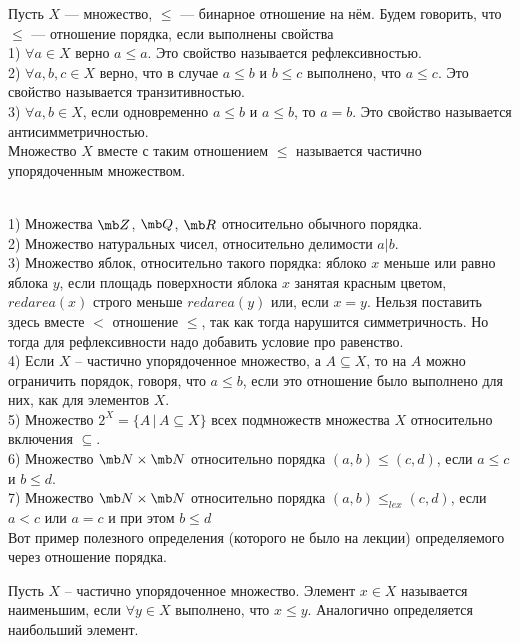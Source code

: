 \dfn Пусть $X$ --- множество, $\leq$ --- бинарное отношение на нём. Будем говорить, что $\leq$ --- отношение порядка, если выполнены свойства\\
1)  $\forall a \in X$ верно $a \leq a$. Это свойство называется рефлексивностью.\\
2)  $\forall a,b,c \in X$ верно, что в случае $a \leq b $ и $b \leq c$ выполнено, что $a \leq c$. Это свойство называется транзитивностью.\\
3)  $\forall a,b \in X$, если одновременно $a\leq b$ и $a \leq b$, то $a=b$. Это свойство называется антисимметричностью.\\
Множество $X$ вместе с таким отношением $\leq$ называется частично упорядоченным множеством.
\edfn

\exm \\
1) Множества $\mb Z$, $\mb Q$, $\mb R$ относительно обычного порядка.\\
2) Множество натуральных чисел, относительно делимости $a | b$.\\
3) Множество яблок, относительно такого порядка: яблоко $x$ меньше или равно яблока $y$, если площадь поверхности яблока $x$ занятая красным цветом, $redarea(x)$ строго меньше $redarea(y)$ или, если  $x=y$. Нельзя поставить здесь вместе $<$ отношение $\leq$, так как тогда нарушится симметричность. Но тогда для рефлексивности надо добавить условие про равенство.\\
4) Если $X$ -- частично упорядоченное множество, а $A \subseteq X$, то на $A$ можно ограничить порядок, говоря, что $a\leq b$, если это отношение было выполнено для них, как для элементов $X$.\\
5) Множество $2^X=\{A\,|\, A \subseteq X\}$ всех подмножеств множества $X$ относительно включения $\subseteq$.\\
6) Множество $\mb N \times \mb N$ относительно порядка $(a,b) \leq (c,d)$, если $a\leq c$ и $b\leq d$.\\
7) Множество $\mb N \times \mb N$ относительно порядка $(a,b) \leq_{lex} (c,d)$, если $a<c$ или $a=c$ и при этом $b\leq d$\\



Вот пример полезного определения (которого не было на лекции) определяемого через отношение порядка.


 Пусть $X$ -- частично упорядоченное множество. Элемент $x\in X$ называется наименьшим, если $\forall y \in X$  выполнено, что $x\leq y$. Аналогично определяется наибольший  элемент.
\edfn









